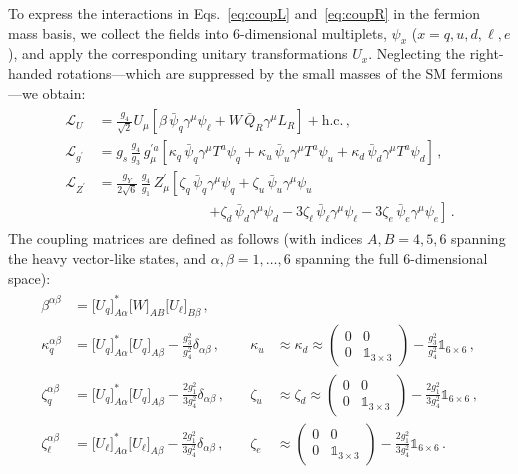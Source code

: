 To express the interactions in Eqs.~\eqref{eq:coupL} and~\eqref{eq:coupR} in the fermion mass basis, we collect the fields into 6-dimensional multiplets, $\psi_x$ ($x=q,u,d,\ell,e$), and apply the corresponding unitary transformations $U_x$. Neglecting the right-handed rotations—which are suppressed by the small masses of the SM fermions—we obtain:
\begin{align}
\begin{aligned}
\mathcal{L}_U &= \frac{g_4}{\sqrt{2}} U_\mu \left[ \beta \,\bar \psi_q \gamma^\mu \psi_\ell + W \, \bar Q_R \gamma^\mu L_R \right] + \text{h.c.}\,, \\
\mathcal{L}_{g^\prime} &= g_s \, \frac{g_4}{g_3} \, g^{\prime a}_\mu \left[ \kappa_q \, \bar \psi_q \gamma^\mu T^a \psi_q + \kappa_u \, \bar \psi_u \gamma^\mu T^a \psi_u + \kappa_d \, \bar \psi_d \gamma^\mu T^a \psi_d \right]\,, \\
\mathcal{L}_{Z^\prime} &= \frac{g_Y}{2\sqrt{6}} \, \frac{g_4}{g_1} \, Z_\mu^\prime \left[ \zeta_q \, \bar \psi_q \gamma^\mu \psi_q + \zeta_u \, \bar \psi_u \gamma^\mu \psi_u\right.\\&\qquad\qquad\qquad\qquad  \left. + \zeta_d \, \bar \psi_d \gamma^\mu \psi_d - 3 \zeta_\ell \, \bar \psi_\ell \gamma^\mu \psi_\ell - 3 \zeta_e \, \bar \psi_e \gamma^\mu \psi_e \right]\,.\label{eq:LLmbS}
\end{aligned}
\end{align}
The coupling matrices are defined as follows (with indices $A,B=4,5,6$ spanning the heavy vector-like states, and $\alpha,\beta=1,\dots,6$ spanning the full 6-dimensional space):
\begin{align}
\begin{aligned}
\beta^{\alpha\beta} &= \big[U_q\big]^*_{A\alpha} \big[W\big]_{AB} \big[U_\ell\big]_{B\beta}\,, \\
\kappa_q^{\alpha\beta} &= \big[U_q\big]^*_{A\alpha} \big[U_q\big]_{A\beta} - \frac{g_3^2}{g_4^2} \delta_{\alpha\beta}\,, \quad &
\kappa_u &\approx \kappa_d \approx
\begin{pmatrix}
0 & 0 \\
0 & \mathbb{1}_{3\times3}
\end{pmatrix}
- \frac{g_3^2}{g_4^2} \mathbb{1}_{6\times6}\,, \\
\zeta_q^{\alpha\beta} &= \big[U_q\big]^*_{A\alpha} \big[U_q\big]_{A\beta} - \frac{2 g_1^2}{3 g_4^2} \delta_{\alpha\beta}\,, \quad &
\zeta_u &\approx \zeta_d \approx
\begin{pmatrix}
0 & 0 \\
0 & \mathbb{1}_{3\times3}
\end{pmatrix}
- \frac{2 g_1^2}{3 g_4^2} \mathbb{1}_{6\times6}\,, \\
\zeta_\ell^{\alpha\beta} &= \big[U_\ell\big]^*_{A\alpha} \big[U_\ell\big]_{A\beta} - \frac{2 g_1^2}{3 g_4^2} \delta_{\alpha\beta}\,, \quad &
\zeta_e &\approx
\begin{pmatrix}
0 & 0 \\
0 & \mathbb{1}_{3\times3}
\end{pmatrix}
- \frac{2 g_1^2}{3 g_4^2} \mathbb{1}_{6\times6}\,.
\end{aligned}
\end{align}
